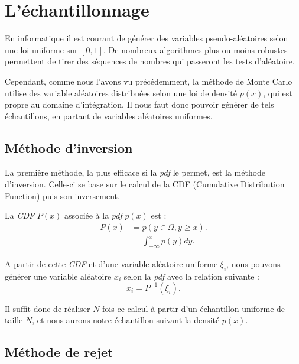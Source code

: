 \section{L'échantillonnage}

En informatique il est courant de générer des variables pseudo-aléatoires selon une loi uniforme sur $[0, 1]$. De nombreux algorithmes plus ou moins robustes permettent de tirer des séquences de nombres qui passeront les tests d'aléatoire.\par
Cependant, comme nous l'avons vu précédemment, la méthode de Monte Carlo utilise des variable aléatoires distribuées selon une loi de densité $p(x)$, qui est propre au domaine d'intégration. Il nous faut donc pouvoir générer de tels échantillons, en partant de variables aléatoires uniformes.

\subsection{Méthode d'inversion}

La première méthode, la plus efficace si la \textit{pdf} le permet, est la méthode d'inversion. Celle-ci se base sur le calcul de la CDF (Cumulative Distribution Function) puis son inversement.\par
La \textit{CDF} $P(x)$ associée à la \textit{pdf} $p(x)$ est :
\large \begin{align}
    P(x) &= p(y \in \Omega, y \geq x) .\\
         &= \int_{-\infty}^{x} p(y) dy
.\end{align} \normalsize \newline\par

A partir de cette \textit{CDF} et d'une variable aléatoire uniforme $\xi_{i}$, nous pouvons générer une variable aléatoire $x_{i}$ selon la \textit{pdf} avec la relation suivante :
\large \begin{equation}
    x_{i} = P^{-1}(\xi_{i})
.\end{equation} \normalsize \par
Il suffit donc de réaliser $N$ fois ce calcul à partir d'un échantillon uniforme de taille $N$, et nous aurons notre échantillon suivant la densité $p(x)$.

\subsection{Méthode de rejet}

